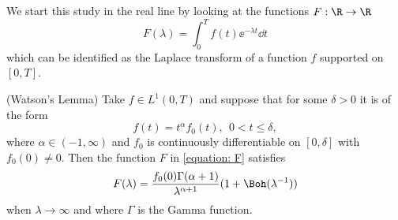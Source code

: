 We start this study in the real line by looking at the functions $F: \R \rightarrow \R$
\begin{equation}
	F(\lambda) = \int_{0}^{T} f(t) \ee^{-\lambda t} \dd t
	\label{equation: F}
\end{equation}
which can be identified as the Laplace transform of a function $f$ supported on $[0,T]$.

\begin{thm}	
	(Watson's Lemma) Take $f \in L^1(0,T)$ and suppose that for some $\delta > 0$ it is of the form
	$$f(t) = t^\alpha f_0(t), \ \ 0 < t \leq \delta,$$
	where $\alpha \in (-1, \infty)$ and $f_0$ is continuously differentiable on $[0, \delta]$ with $f_0(0) \neq 0$. Then the function $F$ in \ref{equation: F} satisfies
	\begin{equation}
		F(\lambda) = \frac{f_0(0) \Gamma(\alpha + 1)}{\lambda^{\alpha + 1}} (1 + \Boh(\lambda^{-1}))
	\end{equation}
	when $\lambda \rightarrow \infty$ and where $\Gamma$ is the Gamma function.
\end{thm}

